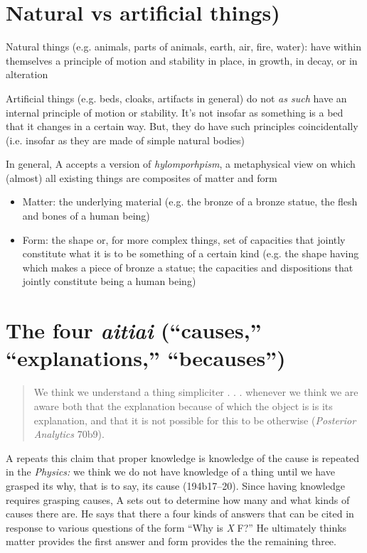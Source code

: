 \documentclass[oneside]{article}
\begin{document}
\thispagestyle{fancy}



\section*{Natural vs artificial things)}

\noindent Natural things (e.g. animals, parts of animals, earth, air, fire, water): have within themselves a principle of motion and stability in place, in growth, in decay, or in alteration
\vspace*{2mm}

\noindent Artificial things (e.g. beds, cloaks, artifacts in general) do not \emph{as such} have an internal principle of motion or stability. It's not insofar as something is a bed that it changes in a certain way. But, they do have such principles coincidentally (i.e. insofar as they are made of simple natural bodies)
\vspace*{2mm}

\noindent In general, A accepts a version of \emph{hylomporhpism}, a metaphysical view on which (almost) all existing things are composites of matter and form
\begin{itemize}\item{Matter: the underlying material (e.g. the bronze of a bronze statue, the flesh and bones of a human being)}\item{Form: the shape or, for more complex things, set of capacities that jointly constitute what it is to be something of a certain kind (e.g. the shape having which makes a piece of bronze a statue; the capacities and dispositions that jointly constitute being a human being)}\end{itemize}

\section*{The four \emph{aitiai} (``causes,'' ``explanations,'' ``becauses'')}


\begin{quote}
We think we understand a thing simpliciter . . . whenever we think we are aware both that the explanation because of which the object is is its explanation, and that it is not possible for this to be otherwise (\emph{Posterior Analytics} 70b9).
\end{quote}
A repeats this claim that proper knowledge is knowledge of the cause is repeated in the \emph{Physics:} we think we do not have knowledge of a thing until we have grasped its why, that is to say, its cause (194b17--20). Since having knowledge requires grasping causes, A sets out to determine how many and what kinds of causes there are.
He says that there a four kinds of answers that can be cited in response to various questions of the form ``Why is \emph{X} F?'' He ultimately thinks matter provides the first answer and form provides the the remaining three.
\end{document}

